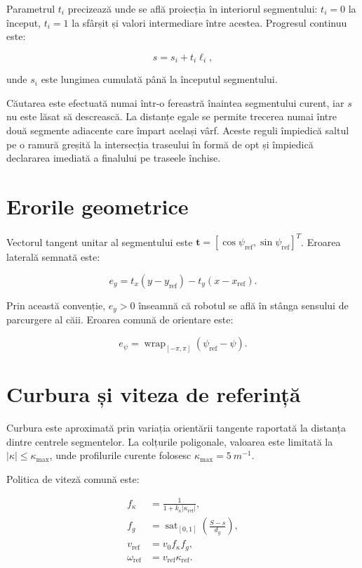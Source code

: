 \documentclass[12pt,a4paper,oneside]{report}
\newcommand{\sat}{\operatorname{sat}}
\newcommand{\wrap}{\operatorname{wrap}_{[-\pi,\pi]}}
\begin{document}
Parametrul $t_i$ precizează unde se află proiecția în interiorul segmentului:
$t_i=0$ la început, $t_i=1$ la sfârșit și valori intermediare între acestea.
Progresul continuu este:

\begin{equation}
  s=s_i+t_i\ell_i,
\end{equation}

unde $s_i$ este lungimea cumulată până la începutul segmentului.

Căutarea este efectuată numai într-o fereastră înaintea segmentului curent, iar
$s$ nu este lăsat să descrească. La distanțe egale se permite trecerea numai
între două segmente adiacente care împart același vârf. Aceste reguli împiedică
saltul pe o ramură greșită la intersecția traseului în formă de opt și împiedică
declararea imediată a finalului pe traseele închise.

\section{Erorile geometrice}

Vectorul tangent unitar al segmentului este
$\mathbf{t}=[\cos\psi_{\mathrm{ref}},\sin\psi_{\mathrm{ref}}]^T$. Eroarea
laterală semnată este:

\begin{equation}
  e_y=t_x(y-y_{\mathrm{ref}})-t_y(x-x_{\mathrm{ref}}).
\end{equation}

Prin această convenție, $e_y>0$ înseamnă că robotul se află în stânga sensului
de parcurgere al căii. Eroarea comună de orientare este:

\begin{equation}
  e_\psi=\wrap(\psi_{\mathrm{ref}}-\psi).
\end{equation}

\section{Curbura și viteza de referință}

Curbura este aproximată prin variația orientării tangente raportată la distanța
dintre centrele segmentelor. La colțurile poligonale, valoarea este limitată la
$|\kappa|\leq\kappa_{\max}$, unde profilurile curente folosesc
$\kappa_{\max}=\SI{5}{m^{-1}}$.

Politica de viteză comună este:

\begin{align}
  f_\kappa &= \frac{1}{1+k_\kappa|\kappa_{\mathrm{ref}}|}, \\
  f_g &= \sat_{[0,1]}\left(\frac{S-s}{d_g}\right), \\
  v_{\mathrm{ref}} &= v_0 f_\kappa f_g, \\
  \omega_{\mathrm{ref}} &= v_{\mathrm{ref}}\kappa_{\mathrm{ref}}.
\end{align}
\end{document}
